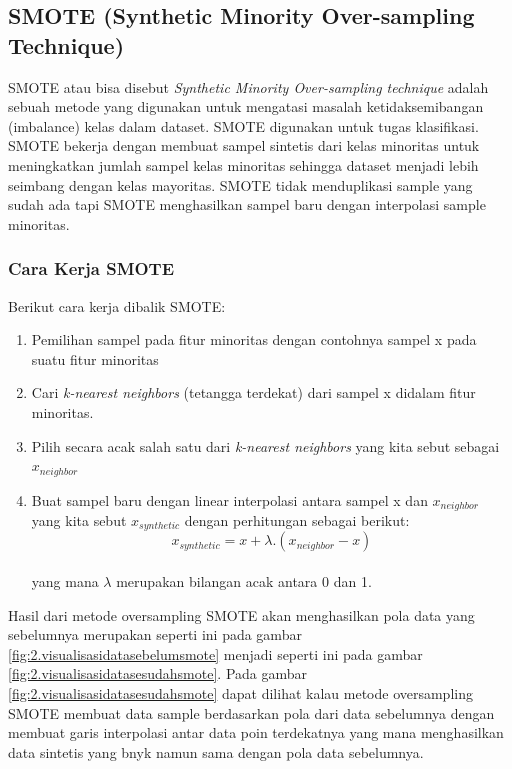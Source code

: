 \subsection{SMOTE (Synthetic Minority Over-sampling Technique)} \label{III.smote}
SMOTE atau bisa disebut \textit{Synthetic Minority Over-sampling technique} adalah sebuah metode yang digunakan untuk mengatasi masalah ketidaksemibangan (imbalance) kelas dalam dataset\cite{chawla2002smote}. SMOTE digunakan untuk tugas klasifikasi. SMOTE bekerja dengan membuat sampel sintetis dari kelas minoritas untuk meningkatkan jumlah sampel kelas minoritas sehingga dataset menjadi lebih seimbang dengan kelas mayoritas\cite{chawla2002smote}. SMOTE tidak menduplikasi sample yang sudah ada tapi SMOTE menghasilkan sampel baru dengan interpolasi sample minoritas\cite{chawla2002smote}.
\subsubsection{Cara Kerja SMOTE}
Berikut cara kerja dibalik SMOTE:
\begin{enumerate}[noitemsep]
    \item Pemilihan sampel pada fitur minoritas dengan contohnya sampel x pada suatu fitur minoritas
    \item Cari \textit{k-nearest neighbors}          (tetangga terdekat) dari sampel x didalam fitur minoritas.
    \item Pilih secara acak salah satu dari \textit{k-nearest neighbors} yang kita sebut sebagai $x_{neighbor}$
    \item Buat sampel baru dengan linear interpolasi antara sampel x dan $x_{neighbor}$ yang kita sebut $x_{synthetic}$ dengan perhitungan sebagai berikut:\\
    
    \begin{equation}
    x_{synthetic} = x + \lambda . (x_{neighbor} - x)   
    \end{equation}\\
    \label{eq:2.smote}
    yang mana $\lambda$ merupakan bilangan acak antara 0 dan 1.
\end{enumerate}
Hasil dari metode oversampling SMOTE akan menghasilkan pola data yang sebelumnya merupakan seperti ini pada gambar \ref{fig:2.visualisasidatasebelumsmote} menjadi seperti ini pada gambar \ref{fig:2.visualisasidatasesudahsmote}. Pada gambar \ref{fig:2.visualisasidatasesudahsmote} dapat dilihat kalau metode oversampling SMOTE membuat data sample berdasarkan pola dari data sebelumnya dengan membuat garis interpolasi antar data poin terdekatnya yang mana menghasilkan data sintetis yang bnyk namun sama dengan pola data sebelumnya.
